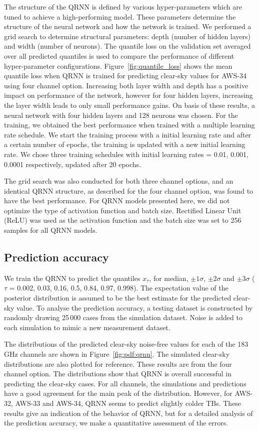 \documentclass[12pt]{article}
\begin{document}
The structure of the QRNN is defined by various hyper-parameters which are
tuned to achieve a high-performing model. These parameters determine the
structure of the neural network and how the network is trained. We performed a
grid search to determine structural parameters: depth (number of hidden layers)
and width (number of neurons). The quantile loss on the validation set averaged
over all predicted quantiles is used to compare the performance of different
hyper-parameter configurations. Figure~\ref{fig:quantile_loss} shows the mean
quantile loss when QRNN is trained for predicting clear-sky values for AWS-34
using four channel option. Increasing both layer width and depth has a positive
impact on performance of the network, however for four hidden layers,
increasing the layer width leads to only small performance gains. On basis of
these results, a neural network with four hidden layers and 128 neurons was
chosen. For the training, we obtained the best performance when trained with a
multiple learning rate schedule. We start the training process with a initial
learning rate and after a certain number of epochs, the training is updated
with a new initial learning rate. We chose three training schedules with
initial learning rates = 0.01, 0.001, 0.0001 respectively, updated after 20
epochs.

The grid search was also conducted for both three channel options, and an identical QRNN structure, as described for the four channel option, was found to have the best performance. For QRNN models presented here, we did not optimize the type of activation function and batch size. Rectified Linear Unit (ReLU) was used as the activation function  and the batch size was set to 256 samples for all QRNN models.   


\subsection{Prediction accuracy}
%
We train the QRNN to predict the quantiles $x_{\tau}$, for median, $\pm 1\sigma$, $\pm 2 \sigma$ and  $\pm 3 \sigma$ ($\tau$ = 0.002, 0.03, 0.16, 0.5, 0.84, 0.97, 0.998). The expectation value of the posterior distribution is assumed to be the best estimate for the predicted clear-sky value. To analyse the prediction accuracy, a testing dataset is constructed by randomly drawing 25\,000 cases from the simulation dataset. Noise is added to each simulation to mimic a new measurement dataset. 

The distributions of the predicted clear-sky noise-free values for each of the
183\, GHz channels are shown in Figure~\ref{fig:pdf:qrnn}. The simulated
clear-sky distributions are also plotted for reference. These results are from
the four channel option. The distributions show that QRNN is overall successful in
predicting the clear-sky cases. For all channels, the simulations and
predictions have a good agreement for the main peak of the distribution.
However, for AWS-32, AWS-33 and AWS-34, QRNN seems to predict slightly colder
TBs. These results give an indication of the behavior of QRNN, but for a
detailed analysis of the prediction accuracy, we make a quantitative assessment
of the errors.
\end{document}

